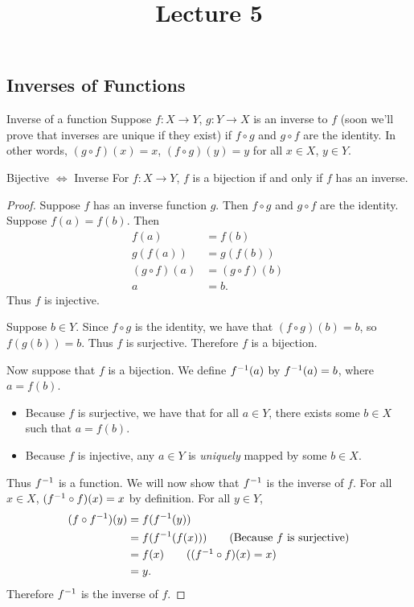 \documentclass[class=article, crop=false]{standalone}
\title{Lecture 5}
\begin{document}
  \maketitle
  \newpage
  \subsection{Inverses of Functions}
  \begin{definition}{Inverse of a function}
    Suppose $f\colon X\to Y$, $g\colon Y\to X$ is an inverse to $f$ (soon we'll prove that inverses are unique if they exist) if $f\circ g$ and $g\circ f$ are the identity. In other words, $(g\circ f)(x) = x$, $(f\circ g)(y) = y$ for all $x\in X$, $y\in Y$.
  \end{definition}
  \begin{theorem}{Bijective $\iff$ Inverse}
    For $f\colon X\to Y$, $f$ is a bijection if and only if $f$ has an inverse.
  \end{theorem}
  \begin{proof}
    Suppose $f$ has an inverse function $g$. Then $f\circ g$ and $g\circ f$ are the identity. Suppose $f(a) = f(b)$. Then
    \begin{align*}
      f(a) &= f(b) \\
      g(f(a)) &= g(f(b)) \\
      (g\circ f)(a) &= (g\circ f)(b)\ \\
      a &= b.
    \end{align*}
    Thus $f$ is injective. \par
    Suppose $b\in Y$. Since $f\circ g$ is the identity, we have that $(f\circ g)(b) = b$, so $f(g(b)) = b$. Thus $f$ is surjective. Therefore $f$ is a bijection. \par
    Now suppose that $f$ is a bijection. We define $f^{-1}(a)$ by $f^{-1}(a) = b$, where $a=f(b)$.
    \begin{itemize}
      \item Because $f$ is surjective, we have that for all $a\in Y$, there exists some $b\in X$ such that $a = f(b)$.
      \item Because $f$ is injective, any $a\in Y$ is \emph{uniquely} mapped by some $b\in X$.
    \end{itemize}
    Thus $f^{-1}$ is a function. We will now show that $f^{-1}$ is the inverse of $f$. For all $x\in X$, $(f^{-1}\circ f)(x) = x$ by definition. For all $y\in Y$,
    \begin{align*}
      (f\circ f\inv)(y) &= f(f\inv(y)) \\
      &= f(f\inv(f(x))) \tag{Because $f$ is surjective} \\
      &= f(x) \tag{$(f\inv\circ f)(x)=x$} \\
      &= y.
    \end{align*}
    Therefore $f^{-1}$ is the inverse of $f$.
  \end{proof}
\end{document}

